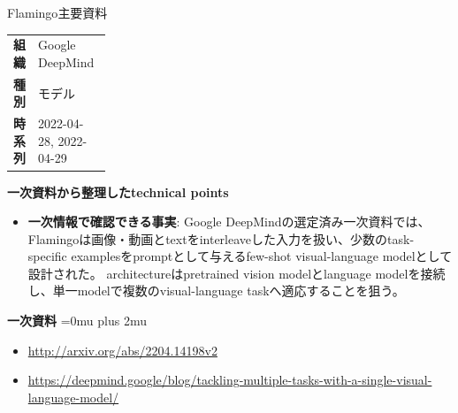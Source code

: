 \begin{technicalnote}{Flamingo}{主要資料}
\begingroup
\begin{tabularx}{\linewidth}{@{}>{\bfseries}p{0.22\linewidth}X@{}}
組織 & Google DeepMind \\
種別 & モデル \\
時系列 & 2022-04-28, 2022-04-29 \\
\end{tabularx}
\smallskip
{\bfseries 一次資料から整理したtechnical points}
\begin{itemize}[leftmargin=1.5em,itemsep=0.35em]
\item \textbf{一次情報で確認できる事実}: Google DeepMindの選定済み一次資料では、Flamingoは画像・動画とtextをinterleaveした入力を扱い、少数のtask-specific examplesをpromptとして与えるfew-shot visual-language modelとして設計された。 architectureはpretrained vision modelとlanguage modelを接続し、単一modelで複数のvisual-language taskへ適応することを狙う。
\end{itemize}
\begin{minipage}{\linewidth}
\begin{samepage}
{\bfseries 一次資料}
\begingroup\sloppy
\Urlmuskip=0mu plus 2mu\relax
\begin{itemize}[leftmargin=1.5em,itemsep=0.25em]
\item {\scriptsize\url{http://arxiv.org/abs/2204.14198v2}}
\item {\scriptsize\url{https://deepmind.google/blog/tackling-multiple-tasks-with-a-single-visual-language-model/}}
\end{itemize}
\endgroup
\end{samepage}
\end{minipage}
\endgroup
\end{technicalnote}
\medskip

